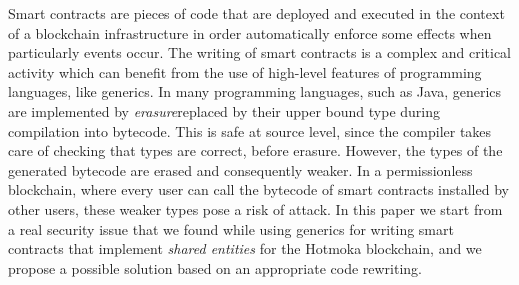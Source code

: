 Smart contracts are pieces of code that are deployed and executed in the context of a blockchain infrastructure in order automatically enforce some effects when particularly events occur. The writing of smart contracts is a complex and critical activity which can benefit from the use of high-level features of programming languages, like generics. In many programming languages, such as Java, generics are implemented by \emph{erasure}\ie replaced by their upper bound type during compilation into bytecode. This is safe at source level, since the compiler takes care of checking that types are correct, before erasure. However, the types of the generated bytecode are erased and consequently weaker. In a permissionless blockchain, where every user can call the bytecode of smart contracts installed by other users, these weaker types pose a risk of attack. In this paper we start from a real security issue that we found while using generics for writing smart contracts that implement \emph{shared entities} for the Hotmoka blockchain, and we propose a possible solution based on an appropriate code rewriting.
